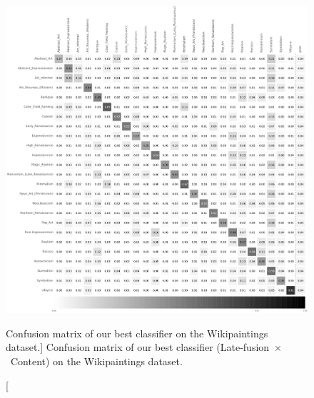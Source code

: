 \begin{figure}[ht!]
\centering
\includegraphics[width=1\linewidth]{../style/figures/evaluation/wikipaintings_conf.pdf}
\caption
[Confusion matrix of our best classifier on the Wikipaintings dataset.]
{Confusion matrix of our best classifier (\mbox{Late-fusion $\times$ Content}) on the Wikipaintings dataset.}
\label{fig:wp_conf}
\end{figure}
